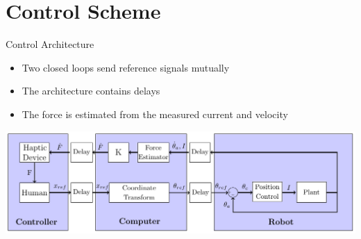 \section{Control Scheme}

\begin{frame}{Control Architecture}{}
  \begin{itemize}
    \item Two closed loops send reference signals mutually
    \item The architecture contains delays
    \item The force is estimated from the measured current and velocity
    \end{itemize}
    \includegraphics[width=\textwidth]{Billeder/Dan/control.pdf}
\end{frame}